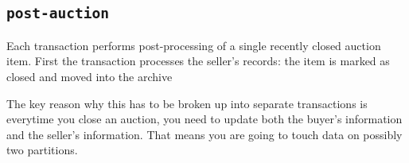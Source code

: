 \documentclass[a4paper,10pt]{article}
\begin{document}
\noindent {}

\subsection{\texttt{post-auction}}
Each transaction performs post-processing of a single recently closed auction item. First the transaction processes the seller's records: the item is marked as closed and moved into the archive 




The key reason why this has to be broken up into separate transactions is everytime you close an auction, you need to update both the buyer's information and the seller's information. That means you are going to touch data on possibly two partitions.






\twocolumn
\appendix

\end{document}
